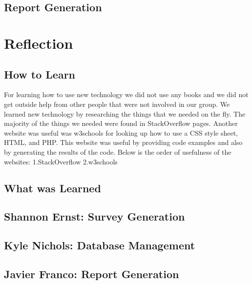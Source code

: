 \documentclass[letterpaper,10pt,serif,draftclsnofoot,onecolumn,compsoc,titlepage]{IEEEtran}
\begin{document}
\subsection{Report Generation}

\section{Reflection}
\subsection{How to Learn}
For learning how to use new technology we did not use any books and we did not get outside help from other people that were not involved in our group.
We learned new technology by researching the things that we needed on the fly.
The majority of the things we needed were found in StackOverflow pages.
Another website was useful was w3schools for looking up how to use a CSS style sheet, HTML, and PHP.
This website was useful by providing code examples and also by generating the results of the code. 
Below is the order of usefulness of the websites:
1.StackOverflow
2.w3schools
\subsection{What was Learned}
\subsection{Shannon Ernst: Survey Generation}
\subsection{Kyle Nichols: Database Management}
\subsection{Javier Franco: Report Generation}

%
%
\begin{appendices}

\end{appendices}
\end{document}

